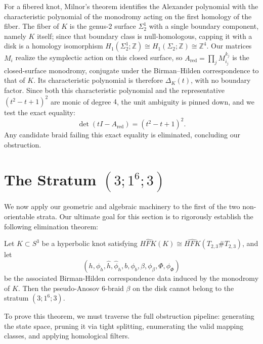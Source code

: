 For a fibered knot, Milnor's theorem identifies the Alexander polynomial with the characteristic polynomial of the monodromy acting on the first homology of the fiber. The fiber of $K$ is the genus-$2$ surface $\Sigma_2^1$ with a single boundary component, namely $K$ itself; since that boundary class is null-homologous, capping it with a disk is a homology isomorphism $H_1(\Sigma_2^1; \mathbb{Z}) \cong H_1(\Sigma_2; \mathbb{Z}) \cong \mathbb{Z}^4$. Our matrices $M_i$ realize the symplectic action on this closed surface, so $A_{\text{red}} = \prod_j M_{i_j}^{k_j}$ is the closed-surface monodromy, conjugate under the Birman--Hilden correspondence to that of $K$. Its characteristic polynomial is therefore $\Delta_K(t)$, with no boundary factor. Since both this characteristic polynomial and the representative $(t^2 - t + 1)^2$ are monic of degree $4$, the unit ambiguity is pinned down, and we test the exact equality:
\begin{equation}
    \det(tI - A_{\text{red}}) = (t^2 - t + 1)^2.
\end{equation}
Any candidate braid failing this exact equality is eliminated, concluding our obstruction.



\section{The Stratum \texorpdfstring{$(3;1^6;3)$}{(3;1\textasciicircum 6;3)}}
\label{sec:analysis_3_16_3}

We now apply our geometric and algebraic machinery to the first of the two non-orientable strata. Our ultimate goal for this section is to rigorously establish the following elimination theorem:

\begin{theorem}\label{thm:candelabra_stratum_classification}
    Let $K \subset S^3$ be a hyperbolic knot satisfying $\widehat{HFK}(K) \cong \widehat{HFK}(T_{2,3} \# T_{2,3})$, and let
    \[
    (h, \phi_h, \hat{h}, \hat{\phi}_h, b, \phi_b, \beta, \phi_\beta, \Phi, \phi_\Phi)
    \]
    be the associated Birman-Hilden correspondence data induced by the monodromy of $K$. Then the pseudo-Anosov 6-braid $\beta$ on the disk cannot belong to the stratum $(3;1^6;3)$.
\end{theorem}

To prove this theorem, we must traverse the full obstruction pipeline: generating the state space, pruning it via tight splitting, enumerating the valid mapping classes, and applying homological filters.

